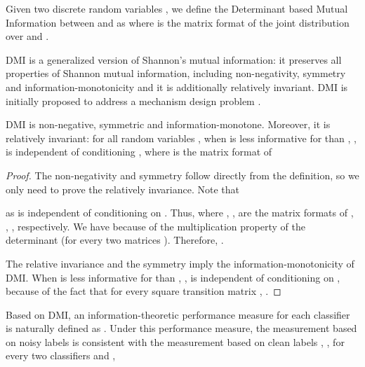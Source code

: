 \begin{definition}\label{def:dmi}
    Given two discrete random variables , we define the Determinant based Mutual Information between  and  as 
    where  is the matrix format of the joint distribution over  and .   
\end{definition} 

DMI is a generalized version of Shannon's mutual information: it preserves all properties of Shannon mutual information, including non-negativity, symmetry and information-monotonicity and it is additionally relatively invariant. DMI is initially proposed to address a mechanism design problem \cite{Kong2019}. 



\begin{lemma}
	DMI is non-negative, symmetric and information-monotone. Moreover, it is relatively invariant: for all random variables , when  is less informative for  than , \ie,  is independent of  conditioning ,   where  is the matrix format of   
\end{lemma}
\begin{proof}
The non-negativity and symmetry follow directly from the definition, so we only need to prove the relatively invariance. Note that
 
as  is independent of  conditioning on . 
Thus,  where , ,  are the matrix formats of , , , respectively. 
We have  because of the multiplication property of the determinant (\ie  for every two matrices ). Therefore, .

The relative invariance and the symmetry imply the information-monotonicity of DMI. When  is less informative for  than , \ie,  is independent of  conditioning on , 
 because of the fact that for every square transition matrix ,  \cite{seneta2006non}. 
\end{proof}

Based on DMI, an information-theoretic performance measure for each classifier  is naturally defined as . Under this performance measure, the measurement based on noisy labels  is consistent with the measurement based on clean labels , \ie, for every two classifiers  and , 
  


